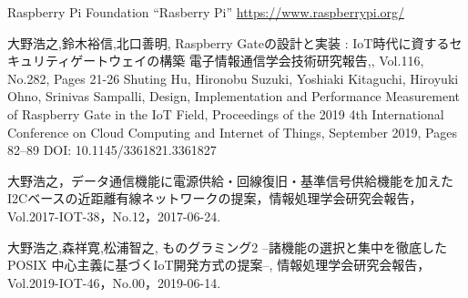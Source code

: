 

\begin{thebibliography}{2}

  Raspberry Pi Foundation ``Rasberry Pi''
  \url{https://www.raspberrypi.org/}



大野浩之,鈴木裕信,北口善明,
Raspberry Gateの設計と実装 : IoT時代に資するセキュリティゲートウェイの構築
電子情報通信学会技術研究報告,,
Vol.116, No.282, Pages 21-26
Shuting Hu, Hironobu Suzuki, Yoshiaki Kitaguchi, Hiroyuki Ohno, Srinivas Sampalli,
Design, Implementation and Performance Measurement of Raspberry Gate in the IoT Field, 
Proceedings of the 2019 4th International Conference on Cloud Computing and Internet of Things, September 2019, Pages 82–89
DOI: 10.1145/3361821.3361827	

  大野浩之，データ通信機能に電源供給・回線復旧・基準信号供給機能を加えたI2Cベースの近距離有線ネットワークの提案，情報処理学会研究会報告，Vol.2017-IOT-38，No.12，2017-06-24.

  大野浩之,森祥寛,松浦智之,  ものグラミング2 --諸機能の選択と集中を徹底したPOSIX 中心主義に基づくIoT開発方式の提案--, 情報処理学会研究会報告，Vol.2019-IOT-46，No.00，2019-06-14.


\end{thebibliography}
